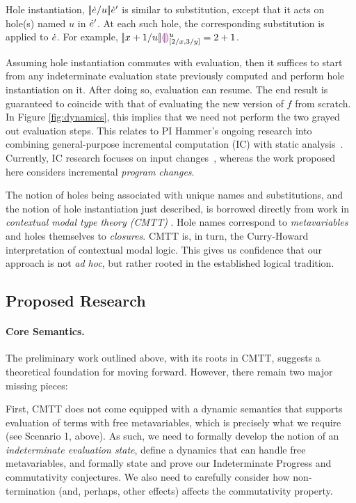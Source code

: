 Hole instantiation, $[\!| \dot{e} / u |\!]\dot{e}'$ is similar to substitution, except that it acts on
 hole(s) named $u$ in $\dot{e}'$. At each such hole, the corresponding substitution is applied to $\dot{e}$. For example,
$[\!| x + 1 / u |\!]\textcolor{violet}{\llparenthesis}\textcolor{violet}{\rrparenthesis}{}^u_{[2/x, 3/y]} = 2 + 1$. 

Assuming hole instantiation commutes with evaluation, then it suffices to start from any indeterminate evaluation 
state previously computed and perform hole instantiation on it. After doing so, evaluation can resume. The end result is guaranteed to coincide with that of evaluating the new version of $f$ from scratch. In Figure \ref{fig:dynamics}, this implies that we need not perform the two grayed out evaluation steps. This relates to PI Hammer's
ongoing research into combining general-purpose incremental
computation (IC) with static analysis~\cite{OVV2016}. 
%
Currently, IC research focuses on input
changes~\cite{TypedAdapton2016, Fisher2016, Hammer2015, Chen2014,
Hammer2014, Chen2011, Hammer2011, Hammer2009, Hammer2008}, whereas the
work proposed here considers incremental \emph{program changes}.

The notion of holes being associated with unique names and substitutions, and the notion of hole instantiation just described, is borrowed directly from work in \emph{contextual modal type theory (CMTT)} \cite{Nanevski2008}. Hole names correspond to \emph{metavariables} and holes themselves to \emph{closures}. CMTT is, in turn, the Curry-Howard interpretation of contextual modal logic. This gives us confidence that our approach is not \emph{ad hoc}, but rather rooted in the established logical tradition.

\subsection{Proposed Research}

\paragraph{Core Semantics.} The preliminary work outlined above, with its roots in CMTT, suggests a theoretical foundation for moving forward. However, there remain two major missing pieces:

First, CMTT does not come equipped with a dynamic semantics that supports evaluation of terms with free metavariables, which is precisely what we require (see Scenario 1, above). As such, we need to formally develop the notion of an \emph{indeterminate evaluation state}, define a dynamics that can handle free metavariables, and formally state and prove our Indeterminate Progress and commutativity conjectures. We also need to carefully consider how non-termination (and, perhaps, other effects) affects the commutativity property.

